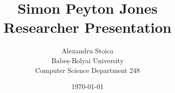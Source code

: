 
\title{Simon Peyton Jones \\ Researcher Presentation}
\author{Alexandru Stoica \\
Babeș-Bolyai University \\ 
Computer Science Department 248}
\date{\today}
